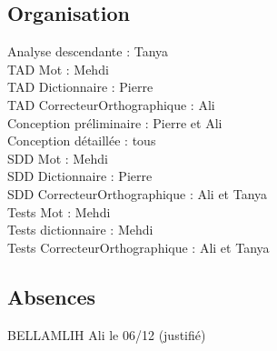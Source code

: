 
	\subsection{Organisation}
	Analyse descendante : Tanya\\
	TAD Mot : Mehdi\\
	TAD Dictionnaire : Pierre\\
	TAD CorrecteurOrthographique : Ali\\
	Conception préliminaire : Pierre et Ali\\
	Conception détaillée : tous\\
	SDD Mot : Mehdi\\
	SDD Dictionnaire : Pierre\\
	SDD CorrecteurOrthographique : Ali et Tanya\\
	Tests Mot : Mehdi\\
	Tests dictionnaire : Mehdi\\
	Tests CorrecteurOrthographique : Ali et Tanya\\
	
	\subsection{Absences}
	BELLAMLIH Ali le 06/12 (justifié)
	

	